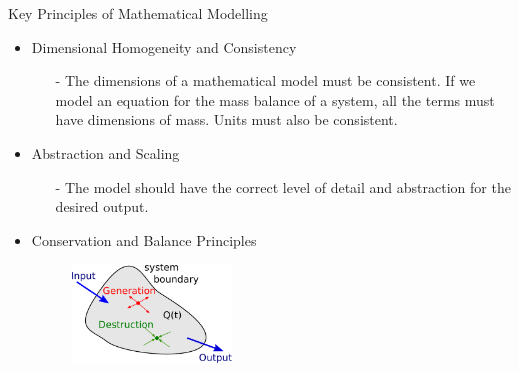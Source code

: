 \documentclass{beamer}
\begin{document}
\begin{frame}{Key Principles of Mathematical Modelling}
\begin{itemize}
\item Dimensional Homogeneity and Consistency
\begin{itemize}
\item[-] The dimensions of a mathematical model must be consistent. If we model an equation for the mass balance of a system, all the terms must have dimensions of mass. Units must also be consistent.
\end{itemize}
\item  Abstraction and Scaling
\begin{itemize}
\item[-] The model should have the correct level of detail and abstraction for the desired output. 
\end{itemize}
\item  Conservation and Balance Principles
\begin{figure}
\centering
\includegraphics[width=0.4\textwidth]{figs/BC.pdf} 
\end{figure}
\end{itemize}
\end{frame}


%
%
%
%
%
\end{document}
